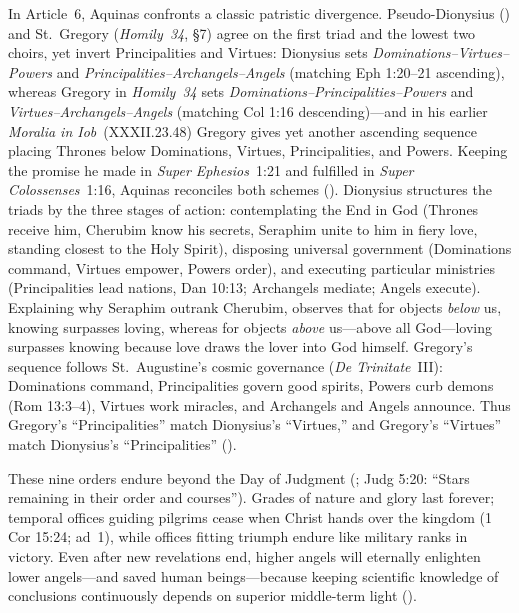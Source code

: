 In Article~6, Aquinas confronts a classic patristic divergence. Pseudo-Dionysius () and St.~Gregory (\emph{Homily~34}, \S7) agree on the first triad and the lowest two choirs, yet invert Principalities and Virtues: Dionysius sets \emph{Dominations--Virtues--Powers} and \emph{Principalities--Archangels--Angels} (matching Eph 1:20--21 ascending), whereas Gregory in \emph{Homily~34} sets \emph{Dominations--Principalities--Powers} and \emph{Virtues--Archangels--Angels} (matching Col 1:16 descending)---and in his earlier \emph{Moralia in Iob}~(XXXII.23.48) Gregory gives yet another ascending sequence placing Thrones below Dominations, Virtues, Principalities, and Powers. Keeping the promise he made in \emph{Super Ephesios}~1:21 and fulfilled in \emph{Super Colossenses}~1:16, Aquinas reconciles both schemes (). Dionysius structures the triads by the three stages of action: contemplating the End in God (Thrones receive him, Cherubim know his secrets, Seraphim unite to him in fiery love, standing closest to the Holy Spirit), disposing universal government (Dominations command, Virtues empower, Powers order), and executing particular ministries (Principalities lead nations, Dan 10:13; Archangels mediate; Angels execute). Explaining why Seraphim outrank Cherubim,  observes that for objects \emph{below} us, knowing surpasses loving, whereas for objects \emph{above} us---above all God---loving surpasses knowing because love draws the lover into God himself. Gregory's sequence follows St.~Augustine's cosmic governance (\emph{De Trinitate}~III): Dominations command, Principalities govern good spirits, Powers curb demons (Rom 13:3--4), Virtues work miracles, and Archangels and Angels announce. Thus Gregory's ``Principalities'' match Dionysius's ``Virtues,'' and Gregory's ``Virtues'' match Dionysius's ``Principalities'' ().

These nine orders endure beyond the Day of Judgment (; Judg 5:20: ``Stars remaining in their order and courses''). Grades of nature and glory last forever; temporal offices guiding pilgrims cease when Christ hands over the kingdom (1 Cor 15:24; ad~1), while offices fitting triumph endure like military ranks in victory. Even after new revelations end, higher angels will eternally enlighten lower angels---and saved human beings---because keeping scientific knowledge of conclusions continuously depends on superior middle-term light ().


